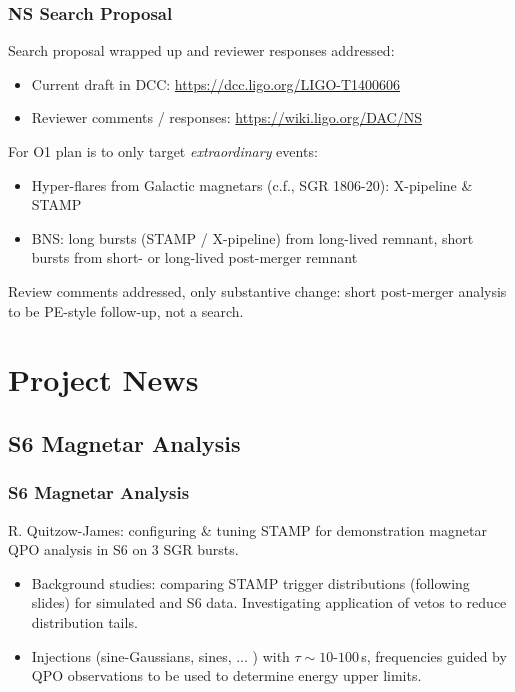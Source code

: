 \documentclass{beamer}
\begin{document}
\begin{frame}
    \frametitle{NS Search Proposal}
    Search proposal wrapped up and reviewer responses addressed:
    \begin{itemize}
        \item Current draft in DCC: {\small \href{https://dcc.ligo.org/LIGO-T1400606}{https://dcc.ligo.org/LIGO-T1400606}}
        \item Reviewer comments / responses: \url{https://wiki.ligo.org/DAC/NS}
    \end{itemize}
    For O1 plan is to only target \emph{extraordinary} events:
    \begin{itemize}
        \item Hyper-flares from Galactic magnetars (c.f., SGR 1806-20):
            X-pipeline \& STAMP
        \item BNS: long bursts (STAMP / X-pipeline) from long-lived remnant,
            short bursts from short- or long-lived post-merger remnant
    \end{itemize}
    Review comments addressed, only substantive change: short post-merger
    analysis to be PE-style follow-up, not a search.
\end{frame}

\section{Project News}

\subsection{S6 Magnetar Analysis}
\begin{frame}
    \frametitle{S6 Magnetar Analysis}
    R. Quitzow-James: configuring \& tuning STAMP for demonstration magnetar QPO
    analysis in S6 on 3 SGR bursts.
    
    \begin{itemize}
        \item Background studies: comparing STAMP trigger distributions
            (following slides) for simulated and S6 data.  Investigating
            application of vetos to reduce distribution tails.
        \item Injections (sine-Gaussians, sines, ... ) with
            $\tau\sim10\mbox{-}100$\,s, frequencies guided by QPO observations
            to be used to determine energy upper limits.  
    \end{itemize}

\end{frame}
\end{document}
